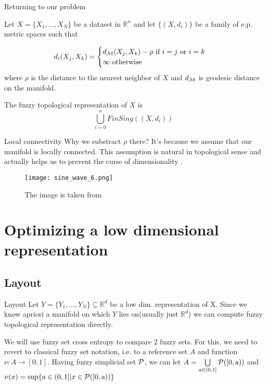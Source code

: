 \documentclass{beamer}
\theoremstyle{named}
\begin{document}
\begin{frame}{Returning to our problem}
	\begin{definition}
		Let $X = \{ X_1, ..., X_N \}$ be a dataset in $\mathbb{R}^n$ and let $ \{ (X, d_i) \} $ be a family of e.p. metric spaces such that
		
		\[
			d_i(X_j, X_k) = \begin{cases}
			d_{\cal{M}}(X_j, X_k) - \rho \text{ if } i = j \text{ or } i = k \\
			\infty \text{ otherwise}
			\end{cases}
		\]
		where $\rho$ is the distance to the nearest neighbor of $X$ and $d_{\cal{M}}$ is geodesic distance on the manifold.
		
		The fuzzy topological representation of $X$ is 
		\[
			\bigcup\limits_{i=0}^n FinSing((X, d_i))
		\]
	\end{definition}
\end{frame}

\begin{frame}{Local connectivity}
	Why we substract $\rho$ there? It's because we assume that our manifold is locally connected. This assumption is natural in topological sense and actually helps us to prevent the curse of dimensionality \cite{talk}.
	\begin{figure}[htp]
		\centering
		\texttt{[image: sine\_wave\_6.png]}
		\caption{The image is taken from \cite{docs}}
	\end{figure}
	
\end{frame}

\section{Optimizing a low dimensional representation}

\subsection{Layout}

\begin{frame}{Layout}
	Let $Y = \{ Y_1, ..., Y_N \} \subseteq \mathbb{R}^d$ be a low dim. representation of X. Since we know apriori a manifold on which $Y$ lies on(usually just $\mathbb{R}^d$) we can compute fuzzy topological representation directly.

	
We will use fuzzy set cross entropy to compare 2 fuzzy sets. For this, we need to revert to classical fuzzy set notation, i.e. to a reference set $A$ and function $\nu: A \to [0,1]$. Having fuzzy simplicial set $\cal{P}$, we can let $A = \bigcup\limits_{a \in (0,1]} \cal{P([\text{0},\text{a}))}$ and $\nu(x) = \sup \{ a \in (0,1] | x \in \cal{P([\text{0},\text{a}))} \}$
\end{frame}
\end{document}
